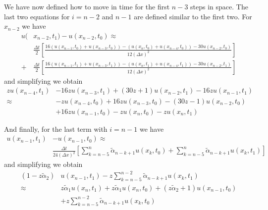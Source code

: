 \documentclass[00main.tex]{subfiles}
\begin{document}
We have now defined how to move in time for the first $n-3$ steps in space. The last two equations for $i=n-2$ and $n-1$ are defined similar to the first two. For $x_{n-2}$ we have \begin{align*}
u(& x_{n-2}, t_1) - u(x_{n-2}, t_0) \approx \\ 
& \frac{\Delta t}{2} \left[ \frac{16(u(x_{n-1},t_0) + u(x_{n-3}, t_0)) - (u(x_{n}, t_0) + u(x_{n-4}, t_0)) - 30 u(x_{n-2}, t_0)}{12 (\Delta x)^2} \right]\\ 
 +& \frac{\Delta t}{2} \left[ \frac{16(u(x_{n-1},t_1) + u(x_{n-3}, t_1)) - (u(x_{n}, t_1) + u(x_{n-4}, t_1)) - 30 u(x_{n-2}, t_1)}{12 (\Delta x)^2} \right]
\end{align*} and simplifying we obtain \begin{align*}
 z u(x_{n-4}, t_1) &- 16 z u(x_{n-3}, t_1) + (30z + 1) u(x_{n-2}, t_1) - 16z u(x_{n-1}, t_1) \\
 \approx &-z u(x_{n-4}, t_0) +16 z u(x_{n-3}, t_0) - (30z-1) u(x_{n-2}, t_0)\\
& + 16z u(x_{n-1}, t_0) -zu(x_{n}, t_0) - zu(x_{n}, t_1)
\end{align*}


And finally, for the last term with $i=n-1$ we have \begin{align*}
u(x_{n-1}, t_1) &- u(x_{n-1}, t_0) \approx \\
& \frac{\Delta t}{24 (\Delta x)^2} \left[ \sum_{k=n-5}^n \tilde{\alpha}_{n-k+1} u(x_k, t_0) + \sum_{k=n-5}^n \tilde{\alpha}_{n-k+1} u(x_k, t_1) \right]
\end{align*} and simplifying we obtain  \begin{align*}
 (1-z\tilde{\alpha}_2) & u(x_{n-1}, t_1) - z\sum_{k=n-5}^{n-2} \tilde{\alpha}_{n-k+1} u(x_{k}, t_1) \\
 \approx & z \tilde{\alpha}_1 u(x_n, t_1) + z \tilde{\alpha}_1 u(x_n, t_0) + (z\tilde{\alpha}_2 +1) u(x_{n-1}, t_0) \\ & + z\sum_{k=n-5}^{n-2} \tilde{\alpha}_{n-k+1} u(x_{k}, t_0) 
\end{align*}
\end{document}
